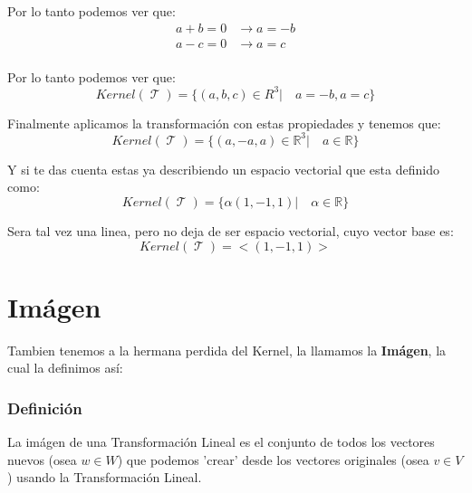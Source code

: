 \documentclass[12pt]{report}                                %
\DeclareMathOperator \LinealTransformation {\mathcal{T}}
\begin{document}
            Por lo tanto podemos ver que:
            \begin{equation*}
            \begin{split}
                a + b = 0 &\to a = -b  \\
                a - c = 0 &\to a = c   \\
             \end{split}
            \end{equation*}

            Por lo tanto podemos ver que:
            \begin{equation*}
                Kernel(\LinealTransformation) = \{(a,b,c)\in R^3 |\quad a = -b, a=c\}
            \end{equation*}

            Finalmente aplicamos la transformación con estas propiedades y tenemos que:
            \begin{equation*}
                Kernel(\LinealTransformation) = \{(a,-a,a)\in \mathbb{R}^3 |\quad a \in \mathbb{R}\}
            \end{equation*}

            Y si te das cuenta estas ya describiendo un espacio vectorial que esta definido como:
            \begin{equation*}
                Kernel(\LinealTransformation) = \{\alpha(1,-1,1) |\quad \alpha\in \mathbb{R}\}
            \end{equation*}

            Sera tal vez una linea, pero no deja de ser espacio vectorial, cuyo vector base es:
            \begin{equation*}
                Kernel(\LinealTransformation) = <(1,-1,1)>
            \end{equation*}


    \clearpage
    \section{Imágen}
        Tambien tenemos a la hermana perdida del Kernel, la llamamos la \textbf{Imágen},
        la cual la definimos así:

        \subsubsection{Definición}
        La imágen de una Transformación Lineal es el conjunto de todos los vectores
        nuevos (osea $w \in W$) que podemos 'crear' desde los vectores originales
        (osea $v \in V$) usando la Transformación Lineal.
\end{document}
